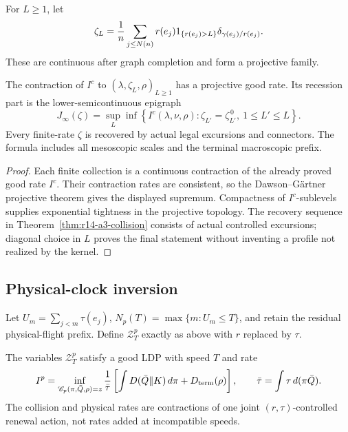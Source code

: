 For \(L\ge1\), let
\[
 \zeta_L={1\over n}\sum_{j\le N(n)}
 r(e_j)1_{\{r(e_j)>L\}}\delta_{\gamma(e_j)/r(e_j)} .
\]
These are continuous after graph completion and form a projective family.

\begin{proposition}
\label{prop:r14-a3-recession}
The contraction of \(I^c\) to
\((\lambda,\zeta_L,\rho)_{L\ge1}\) has a projective good rate.  Its recession
part is the lower-semicontinuous epigraph
\[
 J_\infty(\zeta)
 =
 \sup_L\inf\left\{
 I^c(\lambda,\nu,\rho):
 \zeta_{L'}=\zeta_{L'}^{\,0},\ 1\le L'\le L
 \right\}.
\]
Every finite-rate \(\zeta\) is recovered by actual legal excursions and
connectors.  The formula includes all mesoscopic scales and the terminal
macroscopic prefix.
\end{proposition}

\begin{proof}
Each finite collection is a continuous contraction of the already proved
good rate \(I^c\).  Their contraction rates are consistent, so the
Dawson--Gärtner projective theorem gives the displayed supremum.  Compactness
of \(I^c\)-sublevels supplies exponential tightness in the projective
topology.  The recovery sequence in
Theorem~\ref{thm:r14-a3-collision} consists of actual controlled excursions;
diagonal choice in \(L\) proves the final statement without inventing a
profile not realized by the kernel.
\end{proof}

\subsection{Physical-clock inversion}

Let \(U_m=\sum_{j<m}\tau(e_j)\),
\(N_p(T)=\max\{m:U_m\le T\}\), and retain the residual physical-flight prefix.
Define \(\mathcal Z_T^p\) exactly as above with \(r\) replaced by \(\tau\).

\begin{theorem}
\label{thm:r14-a3-physical}
The variables \(\mathcal Z_T^p\) satisfy a good LDP with speed \(T\) and rate
\[
 I^p
 =
 \inf_{\mathscr C_p(\pi,\bar Q,\rho)=z}
 {1\over\bar\tau}
 \left[
 \int D(\bar Q\Vert K)\,d\pi
 +D_{\rm term}(\rho)
 \right],
 \qquad
 \bar\tau=\int\tau\,d(\pi\bar Q).
\]
The collision and physical rates are contractions of one joint
\((r,\tau)\)-controlled renewal action, not rates added at incompatible
speeds.
\end{theorem}

